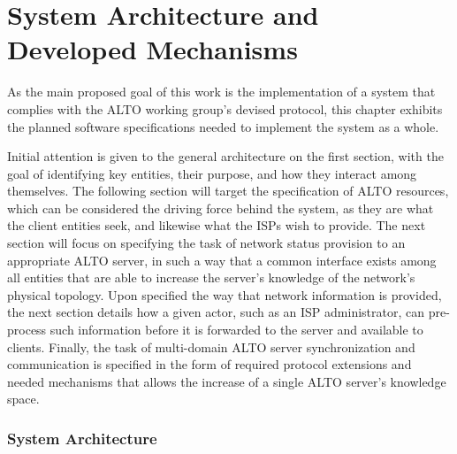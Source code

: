 \chapter{System Architecture and Developed Mechanisms}

    As the main proposed goal of this work is the implementation of a system that complies with the ALTO working group's devised protocol, this chapter exhibits the planned software specifications needed to implement the system as a whole.

    Initial attention is given to the general architecture on the first section, with the goal of identifying key entities, their purpose, and how they interact among themselves.
    The following section will target the specification of ALTO resources, which can be considered the driving force behind the system, as they are what the client entities seek, and likewise what the ISPs wish to provide.
    The next section will focus on specifying the task of network status provision to an appropriate ALTO server, in such a way that a common interface exists among all entities that are able to increase the server's knowledge of the network's physical topology.
    Upon specified the way that network information is provided, the next section details how a given actor, such as an ISP administrator, can pre-process such information before it is forwarded to the server and available to clients.
    Finally, the task of multi-domain ALTO server synchronization and communication is specified in the form of required protocol extensions and needed mechanisms that allows the increase of a single ALTO server's knowledge space.


\subsection{System Architecture}

